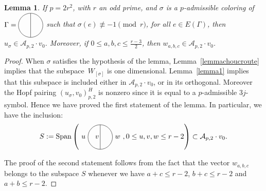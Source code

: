 \documentclass[11pt]{article}
\numberwithin{equation}{section}
\newtheorem{Lemma}[Theorem]{Lemma}
\begin{document}
\begin{Lemma}\label{lemma3}If $p=2r^2$, with $r$ an odd prime, and $\sigma$ is a $p$-admissible coloring of $\Gamma=\Thetagraph$ such that $\sigma(e) \not\equiv -1 \pmod{r}$, for all $e\in E(\Gamma)$, then $u_{\sigma}\in \mathcal{A}_{p,2}\cdot v_0$. Moreover, if $0\leq a,b,c \leq \frac{r-3}{2}$, then $w_{a,b,c}\in \mathcal{A}_{p,2}\cdot v_0$.
\end{Lemma}

\begin{proof} When $\sigma$ satisfies the hypothesis of the lemma, Lemma~\ref{lemmachoucroute} implies that the sub\-spa\-ce~$W_{[\sigma]}$ is one dimensional. Lemma~\ref{lemma1} implies that this subspace is included either in $\mathcal{A}_{p,2}\cdot v_0$, or in its orthogonal. Moreover the Hopf pairing $\left( u_{\sigma}, v_0 \right)^H_{p,2}$ is nonzero since it is equal to a $p$-admissible $3j$-symbol. Hence we have proved the first statement of the lemma. In particular, we have the inclusion:
\begin{gather*} S:=\Span \left(\thetagraph{$u$}{$v$}{$w$}, 0\leq u,v,w \leq r-2 \right) \subset \mathcal{A}_{p,2}\cdot v_0.\end{gather*}

The proof of the second statement follows from the fact that the vector $w_{a,b,c}$ belongs to the subspace $S$ whenever we have $a+c\leq r-2$, $b+c\leq r-2$ and $a+b\leq r-2$.
\end{proof}
\end{document}
